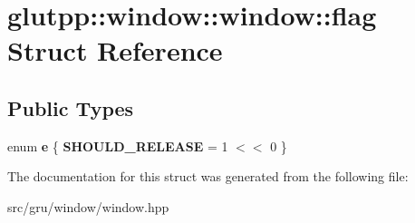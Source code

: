 \hypertarget{structglutpp_1_1window_1_1window_1_1flag}{\section{glutpp\-:\-:window\-:\-:window\-:\-:flag \-Struct \-Reference}
\label{structglutpp_1_1window_1_1window_1_1flag}
}
\subsection*{\-Public \-Types}
\begin{DoxyCompactItemize}
\item 
enum {\bfseries e} \{ {\bfseries \-S\-H\-O\-U\-L\-D\-\_\-\-R\-E\-L\-E\-A\-S\-E} =  1 $<$$<$ 0
 \}
\end{DoxyCompactItemize}


\-The documentation for this struct was generated from the following file\-:\begin{DoxyCompactItemize}
\item 
src/gru/window/window.\-hpp\end{DoxyCompactItemize}

